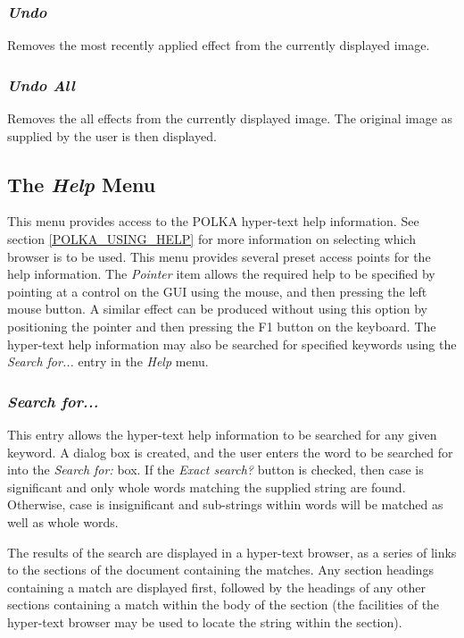 \documentclass[11pt]{article}
\newcommand{\hyperref}[4]{#2\ref{#4}#3}
\newcommand{\htmlref}[2]{#1}
\newcommand{\xlabel}[1]{}
\newcommand{\mylabel}[1] {\xlabel{#1}\label{#1}}
\begin{document}
\subsubsection {\mylabel{POLKA_UNDO_EFFECT}\emph{Undo} }
Removes the most recently applied effect from the currently displayed
image.

\subsubsection {\mylabel{POLKA_UNDO_ALL_EFFECTS}\emph{Undo All} }
Removes the all effects from the currently displayed image. The original
image as supplied by the user is then displayed.

\subsection {\mylabel{POLKA_HELP_MENU}The \emph{Help} Menu}
This menu provides access to the POLKA hyper-text help information.
\hyperref{Go here}{See section }{}{POLKA_USING_HELP} for more information
on selecting which browser is to be used. This menu provides several preset
access points for the help information. The \emph{Pointer} item allows the
required help to be specified by pointing at a control on the GUI using the
mouse, and then pressing the left mouse button. A similar effect can be
produced without using this option by positioning the pointer and then
pressing the F1 button on the keyboard. The hyper-text help information
may also be searched for specified keywords using the
\htmlref{\emph{Search for...}}{POLKA_HSEARCH} entry in the \emph{Help} menu.

\subsubsection {\mylabel{POLKA_HSEARCH}\emph{Search for...}}
This entry allows the hyper-text help information to be searched for any
given keyword. A dialog box is created, and the user enters the word to
be searched for into the \emph{Search for:} box. If the \emph{Exact
search?} button is checked, then case is significant and only whole words
matching the supplied string are found. Otherwise, case is insignificant
and sub-strings within words will be matched as well as whole words.

The results of the search are displayed in a hyper-text browser, as a
series of links to the sections of the document containing the matches.
Any section headings containing a match are displayed first, followed by
the headings of any other sections containing a match within the body of
the section (the facilities of the hyper-text browser may be used to
locate the string within the section).
\end{document}
